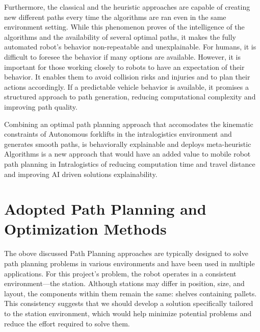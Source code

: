 Furthermore, the classical and the heuristic approaches are capable of creating new different paths every time the 
algorithms are ran even in the same environment setting. While this phenomenon proves of the intelligence of the algorithms
and the availability of several optimal paths, it makes the fully automated robot's behavior non-repeatable and unexplainable. 
For humans, it is difficult to foresee the behavior if many options are available. However, it is important for those working 
closely to robots to have an expectation of their behavior. It enables them to avoid collision risks and injuries and to 
plan their actions accordingly. If a predictable vehicle behavior is available, it promises a structured approach to path 
generation, reducing computational complexity and improving path quality.

Combining an optimal path planning approach that accomodates the kinematic constraints of Autonomous forklifts in the
intralogistics environment and generates smooth paths, is behaviorally explainable and deploys meta-heuristic 
Algorithms is a new approach that would have an added value to mobile robot path planning in Intralogistics of 
reducing computation time and travel distance and improving AI driven solutions explainability. 

\section{Adopted Path Planning and Optimization Methods}

The obove discussed Path Planning approaches are typically
designed to solve path planning problems in various environments and have been used in multiple
applications.
For this project's problem, the robot operates in a consistent environment—the station. 
Although stations may differ in 
position, size, and layout, the components within them remain the same: shelves containing pallets. 
This consistency suggests that we should 
develop a solution specifically tailored to the station environment, which would help minimize potential problems 
and reduce the effort required to solve them. 

